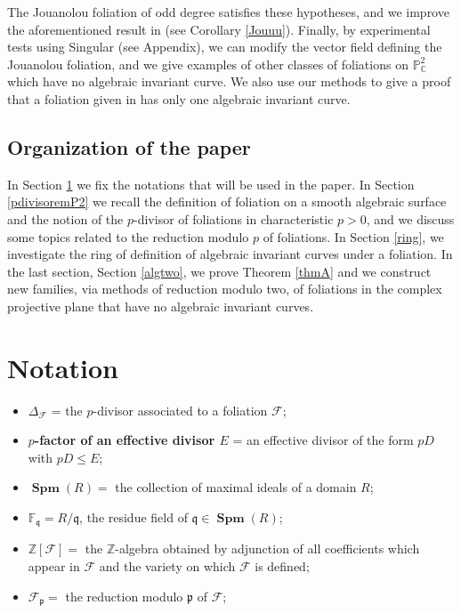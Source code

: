 \documentclass[reqno,oneside,11pt]{amsart}
\theoremstyle{definition}
\DeclareMathOperator{\spm}{\textbf{Spm}}
\begin{document}
The Jouanolou foliation of odd degree satisfies these hypotheses, and we improve the aforementioned result in \cite{mendson2023arithmetic} (see Corollary \ref{Jouuu}). Finally, by experimental tests using Singular (see Appendix), we can modify the vector field defining the Jouanolou foliation, and we give examples of other classes of foliations on $\mathbb{P}^2_{\mathbb{C}}$ which have no algebraic invariant curve. We also use our methods to give a proof that a foliation given in \cite{alcantara2020foliations} has only one algebraic invariant curve. 



\subsection{Organization of the paper} In Section \ref{notacoes} we fix the notations that will be used in the paper. In Section \ref{pdivisoremP2} we recall the definition of foliation on a smooth algebraic surface and the notion of the $p$-divisor of foliations in characteristic $p>0$, and we discuss some topics related to the reduction modulo $p$ of foliations.  In Section \ref{ring}, we investigate the ring of definition of algebraic invariant curves under a foliation. In the last section, Section \ref{algtwo}, we prove Theorem \ref{thmA} and we construct new families, via methods of reduction modulo two, of foliations in the complex projective plane that have no algebraic invariant curves.

\section{Notation} \label{notacoes}


\begin{itemize}

    \item $\Delta_{\mathcal{F}}$ = the $p$-divisor associated to a foliation $\mathcal{F}$;
    
    \item \textbf{$p$-factor of an effective divisor $E$} = an effective divisor of the form $pD$ with $pD\leq E$;

    \item $\spm(R) = $ the collection of maximal ideals of a domain $R$;

    \item $\mathbb{F}_{\mathfrak{q}} = R/\mathfrak{q}$, the residue field of $\mathfrak{q}\in \spm(R)$;
    
    \item $\mathbb{Z}[\mathcal{F}]=$ the $\mathbb{Z}$-algebra obtained by adjunction of all coefficients which appear in $\mathcal{F}$ and the variety on which $\mathcal{F}$ is defined;

    \item $\mathcal{F}_\mathfrak{p} = $ the reduction modulo $\mathfrak{p}$ of $\mathcal{F}$;
    
\end{itemize}
\end{document}
